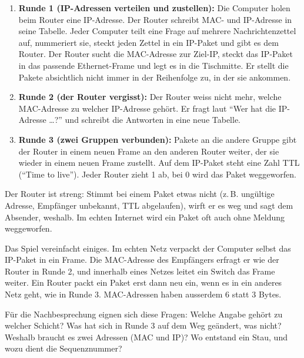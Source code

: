 \begin{enumerate}
	\item \textbf{Runde 1 (IP-Adressen verteilen und zustellen):} Die Computer holen beim Router eine \acrshort{IP}-Adresse. Der Router schreibt \acrshort{MAC}- und \acrshort{IP}-Adresse in seine Tabelle. Jeder Computer teilt eine Frage auf mehrere Nachrichtenzettel auf, nummeriert sie, steckt jeden Zettel in ein IP-Paket und gibt es dem Router. Der Router sucht die \acrshort{MAC}-Adresse zur Ziel-\acrshort{IP}, steckt das IP-Paket in das passende Ethernet-Frame und legt es in die Tischmitte. Er stellt die Pakete absichtlich nicht immer in der Reihenfolge zu, in der sie ankommen.
	\item \textbf{Runde 2 (der Router vergisst):} Der Router weiss nicht mehr, welche \acrshort{MAC}-Adresse zu welcher \acrshort{IP}-Adresse gehört. Er fragt laut \enquote{Wer hat die IP-Adresse \dots?} und schreibt die Antworten in eine neue Tabelle.
	\item \textbf{Runde 3 (zwei Gruppen verbunden):} Pakete an die andere Gruppe gibt der Router in einem neuen Frame an den anderen Router weiter, der sie wieder in einem neuen Frame zustellt. Auf dem IP-Paket steht eine Zahl TTL (\enquote{Time to live}). Jeder Router zieht 1 ab, bei 0 wird das Paket weggeworfen.
\end{enumerate}

Der Router ist streng: Stimmt bei einem Paket etwas nicht (z.\,B. ungültige Adresse, Empfänger unbekannt, TTL abgelaufen), wirft er es weg und sagt dem Absender, weshalb. Im echten Internet wird ein Paket oft auch ohne Meldung weggeworfen.

\begin{myremark}
	Das Spiel vereinfacht einiges. Im echten Netz verpackt der Computer selbst das IP-Paket in ein Frame. Die \acrshort{MAC}-Adresse des Empfängers erfragt er wie der Router in Runde 2, und innerhalb eines Netzes leitet ein Switch das Frame weiter. Ein Router packt ein Paket erst dann neu ein, wenn es in ein anderes Netz geht, wie in Runde 3. \acrshort{MAC}-Adressen haben ausserdem 6 statt 3 Bytes.
\end{myremark}

Für die Nachbesprechung eignen sich diese Fragen: Welche Angabe gehört zu welcher Schicht? Was hat sich in Runde 3 auf dem Weg geändert, was nicht? Weshalb braucht es zwei Adressen (\acrshort{MAC} und \acrshort{IP})? Wo entstand ein Stau, und wozu dient die Sequenznummer?

